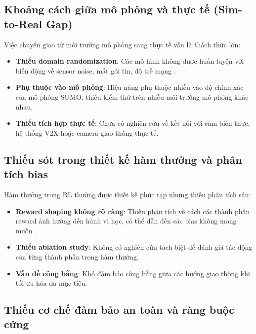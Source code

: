\subsection{Khoảng cách giữa mô phỏng và thực tế (Sim-to-Real Gap)}

Việc chuyển giao từ môi trường mô phỏng sang thực tế vẫn là thách thức lớn:

\begin{itemize}
    \item \textbf{Thiếu domain randomization}: Các mô hình không được huấn luyện với biến động về sensor noise, mất gói tin, độ trễ mạng \cite{Lopez2018}.
    
    \item \textbf{Phụ thuộc vào mô phỏng}: Hiệu năng phụ thuộc nhiều vào độ chính xác của mô phỏng SUMO, thiếu kiểm thử trên nhiều môi trường mô phỏng khác nhau.
    
    \item \textbf{Thiếu tích hợp thực tế}: Chưa có nghiên cứu về kết nối với cảm biến thực, hệ thống V2X hoặc camera giao thông thực tế.
\end{itemize}

\subsection{Thiếu sót trong thiết kế hàm thưởng và phân tích bias}

Hàm thưởng trong RL thường được thiết kế phức tạp nhưng thiếu phân tích sâu:

\begin{itemize}
    \item \textbf{Reward shaping không rõ ràng}: Thiếu phân tích về cách các thành phần reward ảnh hưởng đến hành vi học, có thể dẫn đến các bias không mong muốn \cite{Sutton2018}.
    
    \item \textbf{Thiếu ablation study}: Không có nghiên cứu tách biệt để đánh giá tác động của từng thành phần trong hàm thưởng.
    
    \item \textbf{Vấn đề công bằng}: Khó đảm bảo công bằng giữa các hướng giao thông khi tối ưu hóa đa mục tiêu.
\end{itemize}

\subsection{Thiếu cơ chế đảm bảo an toàn và ràng buộc cứng}

